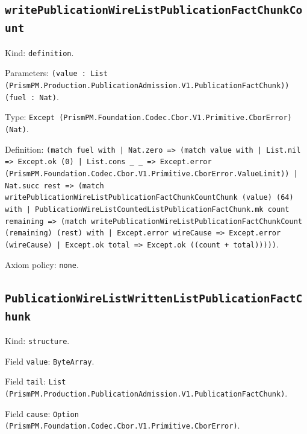 \documentclass[11pt]{article}
\begin{document}
\subsection*{\texttt{writePublicationWireListPublicationFactChunkCount}}
\noindent Kind: \texttt{definition}.\par
\noindent Parameters: \texttt{(value : List (PrismPM.Production.PublicationAdmission.V1.PublicationFactChunk)) (fuel : Nat)}.\par
\noindent Type: \texttt{Except (PrismPM.Foundation.Codec.Cbor.V1.Primitive.CborError) (Nat)}.\par
\noindent Definition: \texttt{(match fuel with | Nat.zero => (match value with | List.nil => Except.ok (0) | List.cons \_ \_ => Except.error (PrismPM.Foundation.Codec.Cbor.V1.Primitive.CborError.ValueLimit)) | Nat.succ rest => (match writePublicationWireListPublicationFactChunkCountChunk (value) (64) with | PublicationWireListCountedListPublicationFactChunk.mk count remaining => (match writePublicationWireListPublicationFactChunkCount (remaining) (rest) with | Except.error wireCause => Except.error (wireCause) | Except.ok total => Except.ok ((count + total)))))}.\par
\noindent Axiom policy: \texttt{none}.\par
\subsection*{\texttt{PublicationWireListWrittenListPublicationFactChunk}}
\noindent Kind: \texttt{structure}.\par
\noindent Field \texttt{value}: \texttt{ByteArray}.\par
\noindent Field \texttt{tail}: \texttt{List (PrismPM.Production.PublicationAdmission.V1.PublicationFactChunk)}.\par
\noindent Field \texttt{cause}: \texttt{Option (PrismPM.Foundation.Codec.Cbor.V1.Primitive.CborError)}.\par
\end{document}
